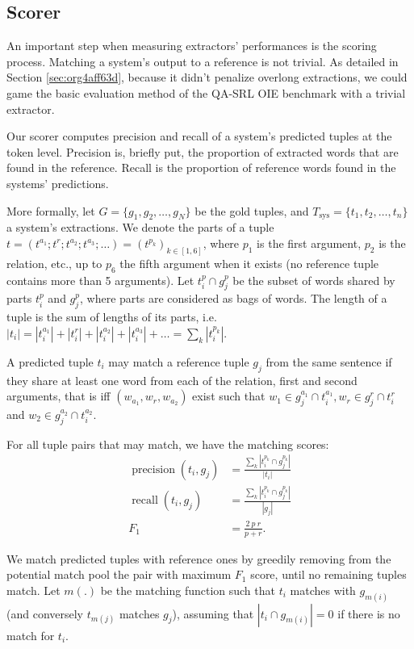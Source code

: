 \pdfoutput=1 \documentclass[11pt, a4paper]{article}
\begin{document}
\subsection{Scorer}
\label{sec:org4b13ea5}


An important step when measuring extractors' performances is the scoring
process. Matching a system's output to a reference is not trivial.  As detailed
in Section \ref{sec:org4aff63d}, because it didn't penalize overlong
extractions, we could game the basic evaluation method of the QA-SRL OIE
benchmark with a trivial extractor.


Our scorer computes precision and recall of a system's predicted tuples at the
token level. Precision is, briefly put, the proportion of extracted words that
are found in the reference. Recall is the proportion of reference words found
in the systems' predictions.

More formally, let \(G = \{g_1, g_2, \dots, g_N\}\) be the gold tuples, and
\(T_{\text{sys}} = \{t_1, t_2, \dots, t_n\}\) a system's extractions. We denote
the parts of a tuple \(t = (t^{a_1} ; t^r ; t^{a_2} ; t^{a_3} ; \dots) =
(t^{p_k})_{k\in[1,6]}\), where \(p_1\) is the first argument, \(p_2\) is the
relation, etc., up to \(p_6\) the fifth argument when it exists (no reference
tuple contains more than 5 arguments). Let \(t_i^{p} \cap g_j^{p}\) be the subset
of words shared by parts \(t_i^{p}\) and \(g_j^{p}\), where parts are considered as
bags of words. The length of a tuple is the sum of lengths of its parts,
i.e. \(|t_i| = |t_i^{a_1}| + |t_i^r| + |t_i^{a_2}| + |t_i^{a_3}|+\dots =
\sum_k |t_i^{p_k}|\).

A predicted tuple \(t_i\) may match a reference tuple \(g_j\) from the same
sentence if they share at least one word from each of the relation, first and
second arguments, that is iff \((w_{a_1}, w_r, w_{a_2})\) exist such
that \(w_{1} \in g_{j}^{a_1} \cap t_{i}^{a_1}, w_r \in g_{j}^{r} \cap t_{i}^{r}\)
and \(w_{2} \in g_{j}^{a_2} \cap t_{i}^{a_2}\).

For all tuple pairs that may match, we have the matching scores: 
\begin{align*}
    \operatorname{precision}(t_i, g_j) & = \frac{\sum_k|t_i^{p_k} \cap g_j^{p_k}|}{|t_i|} \\
\operatorname{recall}(t_i, g_j) & = \frac{\sum_k|t_i^{p_k} \cap g_j^{p_k}|}{|g_j|}\\
    F_1 & = \frac{2\ p\ r}{p+r}.
\end{align*}

We match predicted tuples with reference ones by greedily removing from the potential match pool the pair with maximum \(F_1\) score, until no remaining tuples match. Let \(m(.)\) be the matching function such that \(t_i\) matches with \(g_{m(i)}\) (and conversely \(t_{m(j)}\) matches \(g_j\)), assuming that \(|t_i \cap g_{m(i)}| = 0\) if there is no match for \(t_i\).
\end{document}
